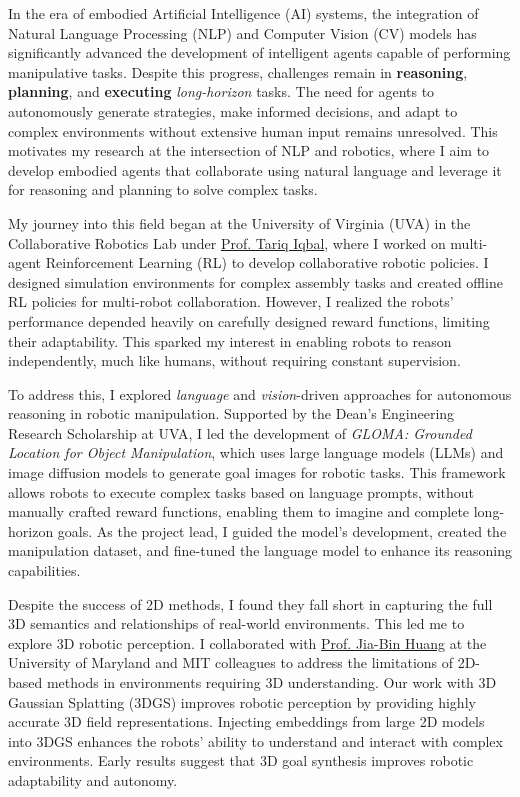 \documentclass[11pt]{article}
\begin{document}
In the era of embodied Artificial Intelligence (AI) systems, the integration of Natural Language Processing (NLP) and Computer Vision (CV) models has significantly advanced the development of intelligent agents capable of performing manipulative tasks. Despite this progress, challenges remain in \textbf{reasoning}, \textbf{planning}, and \textbf{executing} \textit{long-horizon} tasks. The need for agents to autonomously generate strategies, make informed decisions, and adapt to complex environments without extensive human input remains unresolved. This motivates my research at the intersection of NLP and robotics, where I aim to develop embodied agents that collaborate using natural language and leverage it for reasoning and planning to solve complex tasks.

My journey into this field began at the University of Virginia (UVA) in the Collaborative Robotics Lab under \href{https://www.tiqbal.com/}{Prof. Tariq Iqbal}, where I worked on multi-agent Reinforcement Learning (RL) to develop collaborative robotic policies. I designed simulation environments for complex assembly tasks and created offline RL policies for multi-robot collaboration. However, I realized the robots' performance depended heavily on carefully designed reward functions, limiting their adaptability. This sparked my interest in enabling robots to reason independently, much like humans, without requiring constant supervision.

To address this, I explored \textit{language} and \textit{vision}-driven approaches for autonomous reasoning in robotic manipulation. Supported by the Dean's Engineering Research Scholarship at UVA, I led the development of \textit{GLOMA: Grounded Location for Object Manipulation}, which uses large language models (LLMs) and image diffusion models to generate goal images for robotic tasks. This framework allows robots to execute complex tasks based on language prompts, without manually crafted reward functions, enabling them to imagine and complete long-horizon goals. As the project lead, I guided the model's development, created the manipulation dataset, and fine-tuned the language model to enhance its reasoning capabilities.

Despite the success of 2D methods, I found they fall short in capturing the full 3D semantics and relationships of real-world environments. This led me to explore 3D robotic perception. I collaborated with \href{https://jbhuang0604.github.io/}{Prof. Jia-Bin Huang} at the University of Maryland and MIT colleagues to address the limitations of 2D-based methods in environments requiring 3D understanding. Our work with 3D Gaussian Splatting (3DGS) improves robotic perception by providing highly accurate 3D field representations. Injecting embeddings from large 2D models into 3DGS enhances the robots' ability to understand and interact with complex environments. Early results suggest that 3D goal synthesis improves robotic adaptability and autonomy.
\end{document}
